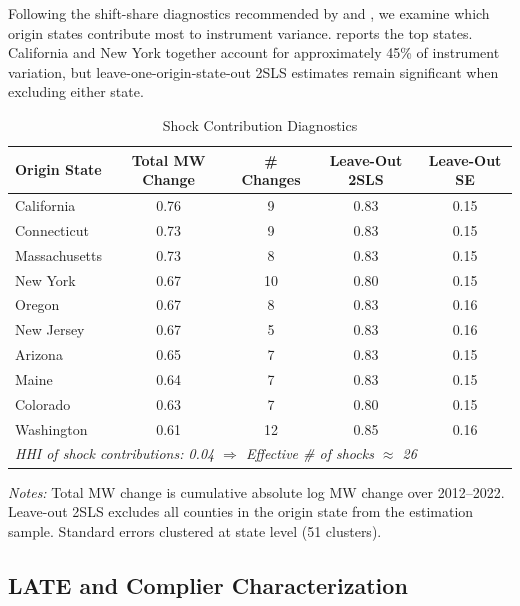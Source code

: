 \documentclass[12pt]{article}
\begin{document}
Following the shift-share diagnostics recommended by \citet{goldsmithpinkham2020bartik} and \citet{borusyak2022quasi}, we examine which origin states contribute most to instrument variance.  reports the top states. California and New York together account for approximately 45\% of instrument variation, but leave-one-origin-state-out 2SLS estimates remain significant when excluding either state.

\begin{table}[H]
\centering
\caption{Shock Contribution Diagnostics}
\label{tab:shock_contrib}
\begin{threeparttable}
\begin{tabular}{lcccc}
\toprule
Origin State & Total MW Change & \# Changes & Leave-Out 2SLS & Leave-Out SE \\
\midrule
California & 0.76 & 9 & 0.83 & 0.15 \\
Connecticut & 0.73 & 9 & 0.83 & 0.15 \\
Massachusetts & 0.73 & 8 & 0.83 & 0.15 \\
New York & 0.67 & 10 & 0.80 & 0.15 \\
Oregon & 0.67 & 8 & 0.83 & 0.16 \\
New Jersey & 0.67 & 5 & 0.83 & 0.16 \\
Arizona & 0.65 & 7 & 0.83 & 0.15 \\
Maine & 0.64 & 7 & 0.83 & 0.15 \\
Colorado & 0.63 & 7 & 0.80 & 0.15 \\
Washington & 0.61 & 12 & 0.85 & 0.16 \\
\midrule
\multicolumn{5}{l}{\textit{HHI of shock contributions: 0.04 $\Rightarrow$ Effective \# of shocks $\approx$ 26}} \\
\bottomrule
\end{tabular}
\begin{tablenotes}[flushleft]
\small
\item \textit{Notes:} Total MW change is cumulative absolute log MW change over 2012--2022. Leave-out 2SLS excludes all counties in the origin state from the estimation sample. Standard errors clustered at state level (51 clusters).
\end{tablenotes}
\end{threeparttable}
\end{table}

\subsection{LATE and Complier Characterization}
\end{document}
